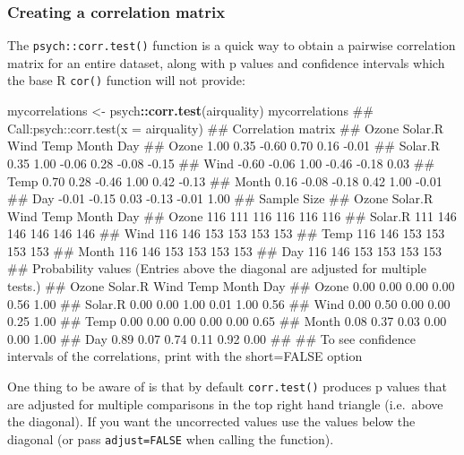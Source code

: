 \documentclass[]{article}
\newenvironment{Shaded}{\begin{snugshade}}{\end{snugshade}}
\newcommand{\KeywordTok}[1]{\textcolor[rgb]{0.13,0.29,0.53}{\textbf{#1}}}
\newcommand{\StringTok}[1]{\textcolor[rgb]{0.31,0.60,0.02}{#1}}
\newcommand{\OperatorTok}[1]{\textcolor[rgb]{0.81,0.36,0.00}{\textbf{#1}}}
\newcommand{\NormalTok}[1]{#1}
\theoremstyle{definition}
\theoremstyle{definition}
\theoremstyle{definition}
\theoremstyle{remark}
\begin{document}
\subsubsection*{Creating a correlation matrix}\label{correlation-matrix}

The \texttt{psych::corr.test()} function is a quick way to obtain a
pairwise correlation matrix for an entire dataset, along with p values
and confidence intervals which the base R \texttt{cor()} function will
not provide:

\begin{Shaded}
\begin{Highlighting}[]
\NormalTok{mycorrelations <-}\StringTok{ }\NormalTok{psych}\OperatorTok{::}\KeywordTok{corr.test}\NormalTok{(airquality)}
\NormalTok{mycorrelations}
\NormalTok{## Call:psych::corr.test(x = airquality)}
\NormalTok{## Correlation matrix }
\NormalTok{##         Ozone Solar.R  Wind  Temp Month   Day}
\NormalTok{## Ozone    1.00    0.35 -0.60  0.70  0.16 -0.01}
\NormalTok{## Solar.R  0.35    1.00 -0.06  0.28 -0.08 -0.15}
\NormalTok{## Wind    -0.60   -0.06  1.00 -0.46 -0.18  0.03}
\NormalTok{## Temp     0.70    0.28 -0.46  1.00  0.42 -0.13}
\NormalTok{## Month    0.16   -0.08 -0.18  0.42  1.00 -0.01}
\NormalTok{## Day     -0.01   -0.15  0.03 -0.13 -0.01  1.00}
\NormalTok{## Sample Size }
\NormalTok{##         Ozone Solar.R Wind Temp Month Day}
\NormalTok{## Ozone     116     111  116  116   116 116}
\NormalTok{## Solar.R   111     146  146  146   146 146}
\NormalTok{## Wind      116     146  153  153   153 153}
\NormalTok{## Temp      116     146  153  153   153 153}
\NormalTok{## Month     116     146  153  153   153 153}
\NormalTok{## Day       116     146  153  153   153 153}
\NormalTok{## Probability values (Entries above the diagonal are adjusted for multiple tests.) }
\NormalTok{##         Ozone Solar.R Wind Temp Month  Day}
\NormalTok{## Ozone    0.00    0.00 0.00 0.00  0.56 1.00}
\NormalTok{## Solar.R  0.00    0.00 1.00 0.01  1.00 0.56}
\NormalTok{## Wind     0.00    0.50 0.00 0.00  0.25 1.00}
\NormalTok{## Temp     0.00    0.00 0.00 0.00  0.00 0.65}
\NormalTok{## Month    0.08    0.37 0.03 0.00  0.00 1.00}
\NormalTok{## Day      0.89    0.07 0.74 0.11  0.92 0.00}
\NormalTok{## }
\NormalTok{##  To see confidence intervals of the correlations, print with the short=FALSE option}
\end{Highlighting}
\end{Shaded}

One thing to be aware of is that by default \texttt{corr.test()}
produces p values that are adjusted for multiple comparisons in the top
right hand triangle (i.e.~above the diagonal). If you want the
uncorrected values use the values below the diagonal (or pass
\texttt{adjust=FALSE} when calling the function).
\end{document}
